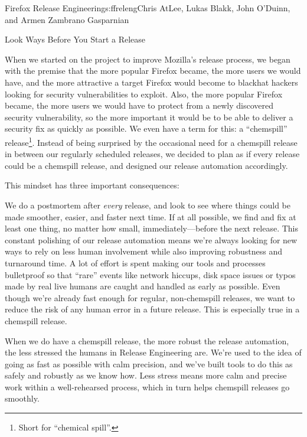 \begin{aosachapter}{Firefox Release Engineering}{s:ffreleng}{Chris AtLee, Lukas Blakk, John O'Duinn, and Armen Zambrano Gasparnian}
\begin{aosasect1}{Look  Ways Before You Start a Release}

When we started on the project to improve Mozilla's release process,
we began with the premise that the more popular Firefox became, the
more users we would have, and the more attractive a target Firefox would
become to blackhat hackers looking for security vulnerabilities to
exploit. Also, the more popular Firefox became, the more users we
would have to protect from a newly discovered security vulnerability,
so the more important it would be to be able to deliver a security fix as quickly
as possible. We even have a term for this: a ``chemspill''
release\footnote{Short for ``chemical spill''.}. Instead of being surprised by the occasional need for a
chemspill release in between our regularly scheduled releases, we
decided to plan as if every release could be a chemspill release, and
designed our release automation accordingly.

This mindset has three important consequences:

\begin{aosaenumerate}

\item We do a postmortem after \emph{every} release, and look to see
  where things could be made smoother, easier, and faster next
  time. If at all possible, we find and fix at least one thing,
  no matter how small, immediately---before the next release. This constant
  polishing of our release automation means we're always looking for
  new ways to rely on less human involvement while also improving
  robustness and turnaround time. A lot of effort is spent
  making our tools and processes bulletproof so that ``rare'' events
  like network hiccups, disk space issues or typos made by real live
  humans are caught and handled as early as possible.  Even though
  we're already fast enough for regular, non-chemspill releases, we
  want to reduce the risk of any human error in a future
  release. This is especially true in a chemspill release.

\item When we do have a chemspill release, the more robust the
  release automation, the less stressed the humans in Release
  Engineering are. We're used to the idea of going as fast as
  possible with calm precision, and we've built tools to do
  this as safely and robustly as we know how. Less stress means more
  calm and precise work within a well-rehearsed process, which in turn
  helps chemspill releases go smoothly.


\end{aosaenumerate}
\end{aosasect1}
\end{aosachapter}
